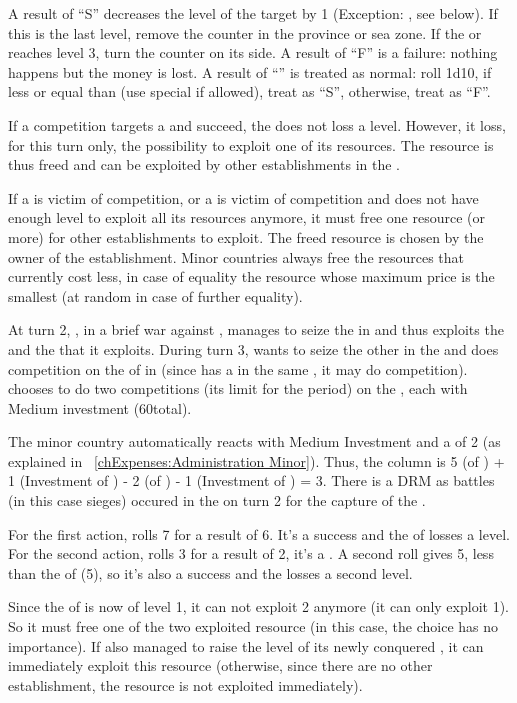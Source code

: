 \aparag[Results]
\bparag A result of ``S'' decreases the level of the target by 1 (Exception:
\COL, see below). If this is the last level, remove the counter in the
province or sea zone. If the \TradeFLEET or \TP reaches level 3, turn the
counter on its \Facemoins side.
\bparag A result of ``F'' is a failure: nothing happens but the money is lost.
\bparag A result of ``\undemi'' is treated as normal: roll 1d10, if less or
equal than \FTI (use special \FTI if allowed), treat as ``S'', otherwise,
treat as ``F''.

 If a competition targets a \COL and succeed, the
\COL does not loss a level.
\bparag However, it loss, for this turn only, the possibility to exploit one
of its resources.
\bparag The resource is thus freed and can be exploited by other
establishments in the \Area.

 If a \COL is victim of competition, or a \TP is
victim of competition and does not have enough level to exploit all its
resources anymore, it must free one resource (or more) for other
establishments to exploit.
\bparag The freed resource is chosen by the owner of the establishment. Minor
countries always free the resources that currently cost less, in case of
equality the resource whose maximum price is the smallest (at random in case
of further equality).

\begin{exemple}
  At turn 2, , in a brief war against \paysGujerat, manages to
  seize the \TP in  and thus exploits the  and
  the  that it exploits. During turn 3, \POR wants to seize the other
   in the \Area and does competition on the \TP of \paysGujerat in
  \provinceKolikot (since \POR has a \TP in the same \Area, it may do
  competition). \POR chooses to do two competitions (its limit for the period)
  on the \TP, each with Medium investment (60\ducats total).

  The minor country automatically reacts with Medium Investment and a \FTI of
  2 (as explained in ~\ref{chExpenses:Administration Minor}). Thus, the column
  is 5 (\FTI of \POR) + 1 (Investment of \POR) - 2 (\FTI of \paysGujerat) - 1
  (Investment of \paysGujerat) = 3. There is a  DRM as battles (in
  this case sieges) occured in the \Area on turn 2 for the capture of the \TP.

  For the first action, \POR rolls 7 for a result of 6. It's a success and the
  \TP of \paysGujerat losses a level. For the second action, \POR rolls 3 for
  a result of 2, it's a \undemi. A second roll gives 5, less than the \FTI of
  \POR (5), so it's also a success and the \TP losses a second level.

  Since the \TP of \paysGujerat is now of level 1, it can not exploit 2
   anymore (it can only exploit 1). So it must free one of the two
  exploited resource (in this case, the choice has no importance). If \POR
  also managed to raise the level of its newly conquered \TP, it can
  immediately exploit this resource (otherwise, since there are no other
  establishment, the resource is not exploited immediately).
\end{exemple}



